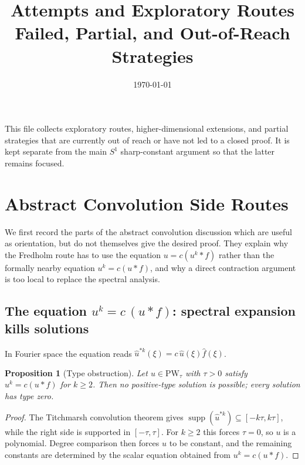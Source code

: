 \documentclass[12pt]{article}
\title{\textbf{Attempts and Exploratory Routes}\\[0.5em]
\large Failed, Partial, and Out-of-Reach Strategies}
\author{}
\date{\today}
\newtheorem{proposition}[theorem]{Proposition}
\theoremstyle{definition}
\theoremstyle{remark}
\DeclareMathOperator{\supp}{supp}
\newcommand{\PW}{\mathrm{PW}}
\newcommand{\wh}{\widehat}
\begin{document}
\maketitle
\tableofcontents
\bigskip

This file collects exploratory routes, higher-dimensional extensions, and
partial strategies that are currently out of reach or have not led to a
closed proof.  It is kept separate from the main $S^1$ sharp-constant
argument so that the latter remains focused.



\section{Abstract Convolution Side Routes}
\label{sec:abstract-side-routes}

We first record the parts of the abstract convolution discussion which are
useful as orientation, but do not themselves give the desired proof.  They
explain why the Fredholm route has to use the equation
$u=c(u^k\ast f)$ rather than the formally nearby equation
$u^k=c(u\ast f)$, and why a direct contraction argument is too local to
replace the spectral analysis.

\subsection{The equation $u^k=c\,(u\ast f)$: spectral expansion kills solutions}

In Fourier space the equation reads
$\wh u^{\ast k}(\xi)=c\,\wh u(\xi)\wh f(\xi)$.

\begin{proposition}[Type obstruction]  \label{prop:type-obstruction}
  Let $u\in\PW_\tau$ with $\tau>0$ satisfy $u^k=c(u\ast f)$ for $k\geq 2$.
  Then no positive-type solution is possible; every solution has type zero.
\end{proposition}

\begin{proof}
  The Titchmarsh convolution theorem gives
  $\supp(\wh u^{\ast k})\subseteq[-k\tau,k\tau]$, while the right side is
  supported in $[-\tau,\tau]$.  For $k\geq 2$ this forces $\tau=0$, so $u$
  is a polynomial.  Degree comparison then forces $u$ to be constant, and
  the remaining constants are determined by the scalar equation obtained
  from $u^k=c(u\ast f)$.
\end{proof}
\end{document}
